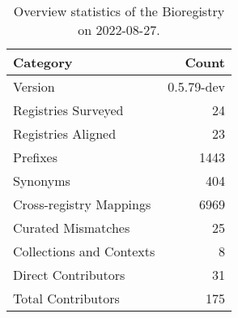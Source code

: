 \begin{table}
\centering
\caption{Overview statistics of the Bioregistry on 2022-08-27.}
\label{tab:bioregistry-summary}
\begin{tabular}{lr}
\toprule
                Category &      Count \\
\midrule
                 Version & 0.5.79-dev \\
     Registries Surveyed &         24 \\
      Registries Aligned &         23 \\
                Prefixes &       1443 \\
                Synonyms &        404 \\
 Cross-registry Mappings &       6969 \\
      Curated Mismatches &         25 \\
Collections and Contexts &          8 \\
     Direct Contributors &         31 \\
      Total Contributors &        175 \\
\bottomrule
\end{tabular}
\end{table}
